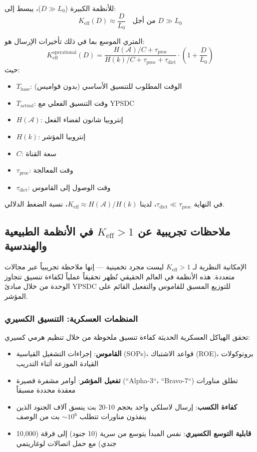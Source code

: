 \documentclass[11pt,a4paper]{article}
\begin{document}
	للأنظمة الكبيرة ($D \gg L_0$)، يبسط إلى:
	\begin{equation}
		K_{\mathrm{eff}}(D) \approx \frac{D}{L_0} \quad \text{من أجل } D \gg L_0
	\end{equation}
	
	المتري الموسع بما في ذلك تأخيرات الإرسال هو:
	\begin{equation}
		K_{\mathrm{eff}}^{\text{operational}}(D) = \frac{H(\mathcal{A})/C + \tau_{\text{proc}}}{H(k)/C + \tau_{\text{proc}} + \tau_{\text{dict}}} \cdot \left(1 + \frac{D}{L_0}\right)
	\end{equation}
	حيث:
	\begin{itemize}
		\item $T_{\text{base}}$: الوقت المطلوب للتنسيق الأساسي (بدون قواميس)
		\item $T_{\text{actual}}$: وقت التنسيق الفعلي مع YPSDC
		\item $H(\mathcal{A})$: إنتروبيا شانون لفضاء الفعل
		\item $H(k)$: إنتروبيا المؤشر
		\item $C$: سعة القناة
		\item $\tau_{\text{proc}}$: وقت المعالجة
		\item $\tau_{\text{dict}}$: وقت الوصول إلى القاموس
	\end{itemize}
	
	في النهاية $\tau_{\text{dict}} \ll \tau_{\text{proc}}$، لدينا $K_{\mathrm{eff}} \approx H(\mathcal{A})/H(k)$، نسبة الضغط الدلالي.
	
	\subsection{ملاحظات تجريبية عن $K_{\mathrm{eff}} > 1$ في الأنظمة الطبيعية والهندسية}
	\label{sec:empirical-keff}
	
	الإمكانية النظرية لـ $K_{\mathrm{eff}} > 1$ ليست مجرد تخمينية — إنها ملاحظة تجريبياً عبر مجالات متعددة. هذه الأنظمة في العالم الحقيقي تُظهر تحقيقاً عملياً لكفاءة تنسيق تتجاوز الوحدة من خلال مبادئ YPSDC للتوزيع المسبق للقاموس والتفعيل القائم على المؤشر.
	
	\subsubsection{المنظمات العسكرية: التنسيق الكسيري}
	تحقق الهياكل العسكرية الحديثة كفاءة تنسيق ملحوظة من خلال تنظيم هرمي كسيري:
	\begin{itemize}
		\item \textbf{القاموس}: إجراءات التشغيل القياسية (SOPs)، قواعد الاشتباك (ROE)، بروتوكولات القيادة الموزعة أثناء التدريب
		\item \textbf{تفعيل المؤشر}: أوامر مشفرة قصيرة (``Alpha-3``، ``Bravo-7``) تطلق مناورات معقدة محددة مسبقاً
		\item \textbf{كفاءة الكسب}: إرسال لاسلكي واحد بحجم 10-20 بت ينسق آلاف الجنود الذين ينفذون مناورات تتطلب $\sim 10^6$ بت من الوصف
		\item \textbf{قابلية التوسع الكسيري}: نفس المبدأ يتوسع من سرية (10 جنود) إلى فرقة (10,000 جندي) مع حمل اتصالات لوغاريتمي
	\end{itemize}
	
\end{document}
